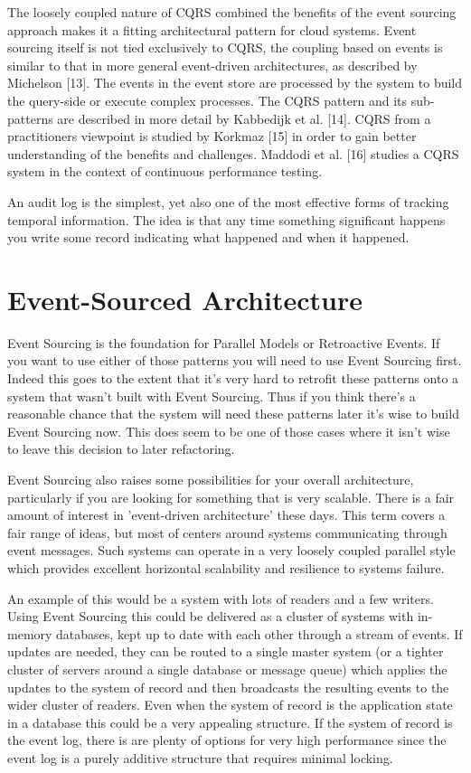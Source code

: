 The loosely coupled nature of CQRS combined the benefits of the event sourcing approach makes it a fitting architectural pattern for cloud systems. Event sourcing itself is not tied exclusively to CQRS, the coupling based on events is similar to that in more general event-driven architectures, as described by Michelson [13]. The events in the event store are processed by the system to build the query-side or execute complex processes. The CQRS pattern and its sub-patterns are described in more detail by Kabbedijk et al. [14]. CQRS from a practitioners viewpoint is studied by Korkmaz [15] in order to gain better understanding of the benefits and challenges. Maddodi et al. [16] studies a CQRS system in the context of continuous performance testing.

An audit log is the simplest, yet also one of the most effective forms of tracking temporal information. The idea is that any time something significant happens you write some record indicating what happened and when it happened.

\section{Event-Sourced Architecture}

Event Sourcing is the foundation for Parallel Models or Retroactive Events. If you want to use either of those patterns you will need to use Event Sourcing first. Indeed this goes to the extent that it's very hard to retrofit these patterns onto a system that wasn't built with Event Sourcing. Thus if you think there's a reasonable chance that the system will need these patterns later it's wise to build Event Sourcing now. This does seem to be one of those cases where it isn't wise to leave this decision to later refactoring.

Event Sourcing also raises some possibilities for your overall architecture, particularly if you are looking for something that is very scalable. There is a fair amount of interest in 'event-driven architecture' these days. This term covers a fair range of ideas, but most of centers around systems communicating through event messages. Such systems can operate in a very loosely coupled parallel style which provides excellent horizontal scalability and resilience to systems failure.

An example of this would be a system with lots of readers and a few writers. Using Event Sourcing this could be delivered as a cluster of systems with in-memory databases, kept up to date with each other through a stream of events. If updates are needed, they can be routed to a single master system (or a tighter cluster of servers around a single database or message queue) which applies the updates to the system of record and then broadcasts the resulting events to the wider cluster of readers. Even when the system of record is the application state in a database this could be a very appealing structure. If the system of record is the event log, there is are plenty of options for very high performance since the event log is a purely additive structure that requires minimal locking.

